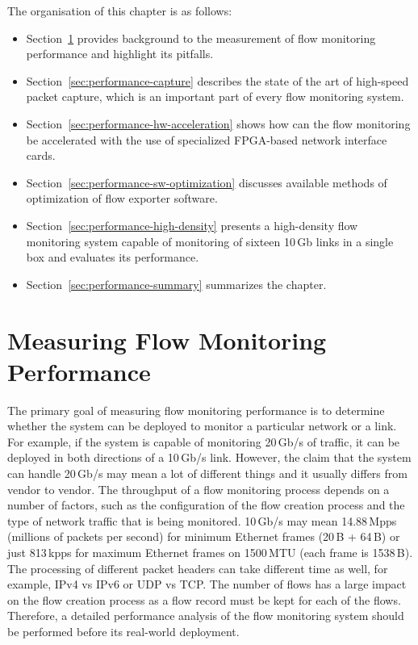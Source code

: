 \begin{chapintro}
The organisation of this chapter is as follows:
\begin{itemize}
  \item Section~\ref{sec:performance-measurement} provides background to the measurement of flow monitoring performance and highlight its pitfalls.
  \item Section~\ref{sec:performance-capture} describes the state of the art of high-speed packet capture, which is an important part of every flow monitoring system.
  \item Section~\ref{sec:performance-hw-acceleration} shows how can the flow monitoring be accelerated with the use of specialized FPGA-based network interface cards.
  \item Section~\ref{sec:performance-sw-optimization} discusses available methods of optimization of flow exporter software.
  \item Section~\ref{sec:performance-high-density} presents a high-density flow monitoring system capable of monitoring of sixteen 10\,Gb links in a single box and evaluates its performance.
  \item Section~\ref{sec:performance-summary} summarizes the chapter.
\end{itemize}

\end{chapintro}

\newpage


\section{Measuring Flow Monitoring Performance}\label{sec:performance-measurement}

The primary goal of measuring flow monitoring performance is to determine whether the system can be deployed to monitor a particular network or a link. For example, if the system is capable of monitoring 20\,Gb/s of traffic, it can be deployed in both directions of a 10\,Gb/s link. However, the claim that the system can handle 20\,Gb/s may mean a lot of different things and it usually differs from vendor to vendor. The throughput of a flow monitoring process depends on a number of factors, such as the configuration of the flow creation process and the type of network traffic that is being monitored. 10\,Gb/s may mean 14.88\,Mpps (millions of packets per second) for minimum Ethernet frames (20\,B + 64\,B) or just 813\,kpps for maximum Ethernet frames on 1500\,MTU (each frame is 1538\,B). The processing of different packet headers can take different time as well, for example, IPv4 vs IPv6 or UDP vs TCP. The number of flows has a large impact on the flow creation process as a flow record must be kept for each of the flows. Therefore, a detailed performance analysis of the flow monitoring system should be performed before its real-world deployment.

